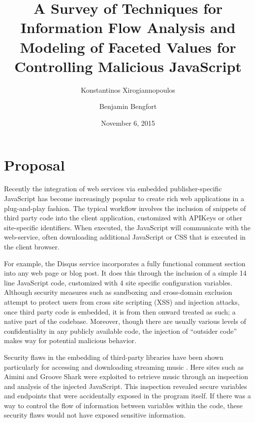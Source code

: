 \documentclass[11pt,letterpaper]{article}
\begin{document}
\title{A Survey of Techniques for Information Flow Analysis and Modeling of Faceted Values for Controlling Malicious JavaScript}
\author[ ]{Konstantinos Xirogiannopoulos}
\author[ ]{Benjamin Bengfort}

\date{November 6, 2015}

\maketitle

\section*{Proposal}

Recently the integration of web services via embedded publisher-specific JavaScript has become increasingly popular to create rich web applications in a plug-and-play fashion. The typical workflow involves the inclusion of snippets of third party code into the client application, customized with APIKeys or other site-specific identifiers. When executed, the JavaScript will communicate with the web-service, often downloading additional JavaScript or CSS that is executed in the client browser.

For example, the Disqus \cite{ha_disqus} service incorporates a fully functional comment section into any web page or blog post. It does this through the inclusion of a simple 14 line JavaScript code, customized with 4 site specific configuration variables. Although security measures such as sandboxing and cross-domain exclusion attempt to protect users from cross site scripting (XSS) and injection attacks, once third party code is embedded, it is from then onward treated as such; a native part of the codebase. Moreover, though there are usually various levels of confidentiality in any publicly available code, the injection of ``outsider code'' makes way for potential malicious behavior.

Security flaws in the embedding of third-party libraries have been shown particularly for accessing and downloading streaming music \cite{payer_exploiting_2013}. Here sites such as Aimini and Groove Shark were exploited to retrieve music through an inspection and analysis of the injected JavaScript. This inspection revealed secure variables and endpoints that were accidentally exposed in the program itself. If there was a way to control the flow of information between variables within the code, these security flaws would not have exposed sensitive information.
\end{document}
